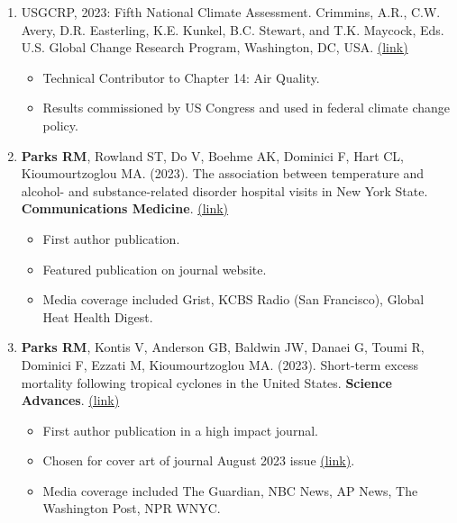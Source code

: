 \begin{enumerate}

    \item USGCRP, 2023: Fifth National Climate Assessment. Crimmins, A.R., C.W. Avery, D.R. Easterling, K.E. Kunkel, B.C. Stewart, and T.K. Maycock, Eds. U.S. Global Change Research Program, Washington, DC, USA. \href{https://nca2023.globalchange.gov/chapter/14/}{(link)}

    \begin{itemize}
        \item Technical Contributor to Chapter 14: Air Quality.
        \item Results commissioned by US Congress and used in federal climate change policy.
    \end{itemize}

    \item \noindent \textbf{Parks RM}, Rowland ST, Do V, Boehme AK, Dominici F, Hart CL, Kioumourtzoglou MA. (2023). The association between temperature and alcohol- and substance-related disorder hospital visits in New York State. \textbf{Communications Medicine}. \href{https://www.nature.com/articles/s43856-023-00346-1}{(link)}

\begin{itemize}
    \item First author publication.
    \item Featured publication on journal website.
    \item Media coverage included Grist, KCBS Radio (San Francisco), Global Heat Health Digest.
\end{itemize}

    \item \textbf{Parks RM}, Kontis V, Anderson GB, Baldwin JW, Danaei G, Toumi R, Dominici F, Ezzati M, Kioumourtzoglou MA. (2023). Short-term excess mortality following tropical cyclones in the United States. \textbf{Science Advances}. \href{https://www.science.org/doi/10.1126/sciadv.adg6633}{(link)} 

    \begin{itemize}
        \item First author publication in a high impact journal.
        \item Chosen for cover art of journal August 2023 issue \href{https://www.science.org/toc/sciadv/9/33}{(link)}.
        \item Media coverage included The Guardian, NBC News, AP News, The Washington Post, NPR WNYC.
    \end{itemize}


\end{enumerate}
